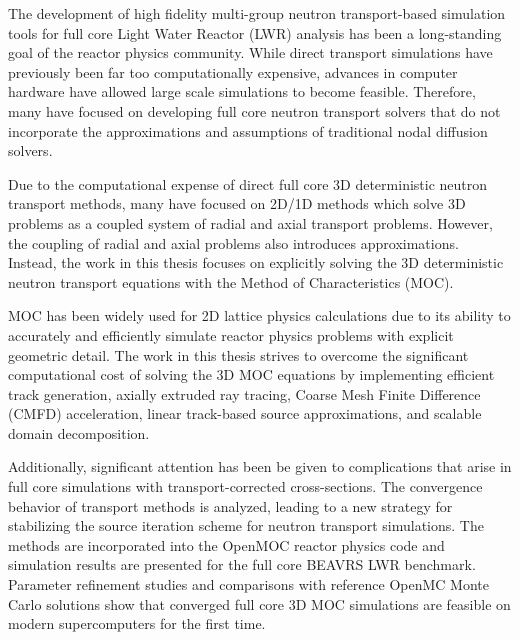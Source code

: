 \begin{abstractpage}

The development of high fidelity multi-group neutron transport-based simulation tools for full core Light Water Reactor (LWR) analysis has been a long-standing goal of the reactor physics community. While direct transport simulations have previously been far too computationally expensive, advances in computer hardware have allowed large scale simulations to become feasible. Therefore, many have focused on developing full core neutron transport solvers that do not incorporate the approximations and assumptions of traditional nodal diffusion solvers. 

Due to the computational expense of direct full core 3D deterministic neutron transport methods, many have focused on 2D/1D methods which solve 3D problems as a coupled system of radial and axial transport problems. However, the coupling of radial and axial problems also introduces approximations. Instead, the work in this thesis focuses on explicitly solving the 3D deterministic neutron transport equations with the Method of Characteristics (MOC).

MOC has been widely used for 2D lattice physics calculations due to its ability to accurately and efficiently simulate reactor physics problems with explicit geometric detail. The work in this thesis strives to overcome the significant computational cost of solving the 3D MOC equations by implementing efficient track generation, axially extruded ray tracing, Coarse Mesh Finite Difference (CMFD) acceleration, linear track-based source approximations, and scalable domain decomposition. 

Additionally, significant attention has been be given to complications that arise in full core simulations with transport-corrected cross-sections. The convergence behavior of transport methods is analyzed, leading to a new strategy for stabilizing the source iteration scheme for neutron transport simulations. The methods are incorporated into the OpenMOC reactor physics code and simulation results are presented for the full core BEAVRS LWR benchmark. Parameter refinement studies and comparisons with reference OpenMC Monte Carlo solutions show that converged full core 3D MOC simulations are feasible on modern supercomputers for the first time.




\end{abstractpage}
